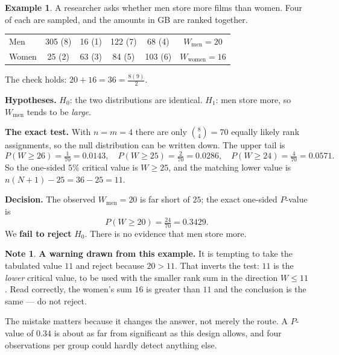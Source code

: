 \documentclass[11pt,a4paper]{article}
\theoremstyle{definition}
\newtheorem{example}[thm]{Example}
\newtheorem{note}[thm]{Note}
\begin{document}
\begin{example}
A researcher asks whether men store more films than women. Four of each are
sampled, and the amounts in GB are ranked together.

\begin{center}
\begin{tabular}{l|cccc|c}
\hline
Men & 305 (8) & 16 (1) & 122 (7) & 68 (4) & $W_{\text{men}} = 20$\\
Women & 25 (2) & 63 (3) & 84 (5) & 103 (6) & $W_{\text{women}} = 16$\\
\hline
\end{tabular}
\end{center}
The check holds: $20 + 16 = 36 = \frac{8(9)}{2}$.

\textbf{Hypotheses.} $H_0$: the two distributions are identical. $H_1$: men store
more, so $W_{\text{men}}$ tends to be \emph{large}.

\textbf{The exact test.} With $n = m = 4$ there are only
$\binom{8}{4} = 70$ equally likely rank assignments, so the null distribution can
be written down. The upper tail is
$$P(W \geq 26) = \tfrac{1}{70} = 0.0143,
\quad
P(W \geq 25) = \tfrac{2}{70} = 0.0286,
\quad
P(W \geq 24) = \tfrac{4}{70} = 0.0571 .$$
So the one-sided $5\%$ critical value is $W \geq 25$, and the matching lower value
is $n(N+1) - 25 = 36 - 25 = 11$.

\textbf{Decision.} The observed $W_{\text{men}} = 20$ is far short of $25$; the
exact one-sided $P$-value is
$$P(W \geq 20) = \tfrac{24}{70} = 0.3429 .$$
We \textbf{fail to reject} $H_0$. There is no evidence that men store more.
\end{example}

\begin{note}
\textbf{A warning drawn from this example.} It is tempting to take the tabulated
value $11$ and reject because $20 > 11$. That inverts the test: $11$ is the
\emph{lower} critical value, to be used with the smaller rank sum in the direction
$W \leq 11$. Read correctly, the women's sum $16$ is greater than $11$ and the
conclusion is the same --- do not reject.

The mistake matters because it changes the answer, not merely the route. A
$P$-value of $0.34$ is about as far from significant as this design allows, and
four observations per group could hardly detect anything else.
\end{note}
\end{document}
